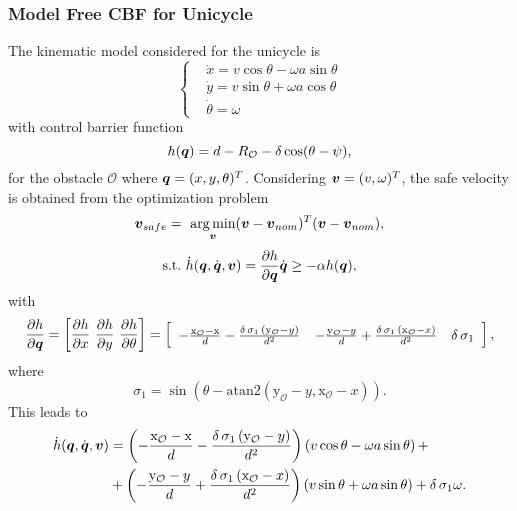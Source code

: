 \subsubsection*{Model Free CBF for Unicycle}
The kinematic model considered for the unicycle is
\begin{equation*}
\left\{ \begin{aligned}
    &\dot{x}      = v\cos\theta -\omega a\sin\theta \\
    &\dot{y}      =  v\sin\theta +\omega a\cos\theta \\
    &\dot{\theta} =  \omega
\end{aligned} \right.
\end{equation*}
with control barrier function
\begin{equation*}
    h({\boldsymbol{q}}) = d-R_{\mathcal{O}}-\delta \cos(\theta - \psi),
\end{equation*}
for the obstacle $\mathcal{O}$ where ${\boldsymbol{q}}=(x,y,\theta)^T$. Considering $\boldsymbol{v} = (v, \omega)^T$, the safe velocity is obtained from the optimization problem 
\begin{equation*}
    \boldsymbol{v}_{safe}=~\underset{\boldsymbol{v}}{\arg\min}(\boldsymbol{v}-\boldsymbol{v}_{nom})^T(\boldsymbol{v}-\boldsymbol{v}_{nom}),
\end{equation*}
\begin{equation*}
    \mathrm{s.t.}\,\, \dot{h}({\boldsymbol{q}},\dot{\boldsymbol{q}},\boldsymbol{v}) = \frac{\partial{h}}{\partial {\boldsymbol{q}}}\dot{\boldsymbol{q}} \geq -\alpha h({\boldsymbol{q}}),
\end{equation*}
with
\begin{equation*}
\frac{\partial{h}}{\partial {\boldsymbol{q}}} = \left[ \frac{\partial{h}}{\partial{x}}\,\, \frac{\partial{h}}{\partial{y}} \,\, \frac{\partial{h}}{\partial{\theta}}  \right]=\left[\begin{array}{ccc}
-\frac{\mathrm{x_\mathcal{O}-x}}{d}-\frac{\delta \,\sigma_1 \,{\left(\mathrm{y_\mathcal{O}}-y\right)}}{d^2} & -\frac{\mathrm{y_\mathcal{O}}-y}{d}+\frac{\delta \,\sigma_1 \,{\left(\mathrm{x_\mathcal{O}}-x\right)}}{d^2} & \delta \,\sigma_1 
\end{array}\right],
\end{equation*}
where
\begin{equation*}
   \sigma_1 =\sin \left(\theta -\textrm{atan2}\left(\mathrm{y_\mathcal{O}}-y,\mathrm{x_\mathcal{O}}-x\right)\right).
\end{equation*}
This leads to
\begin{equation*}
\begin{split}
    \dot{h}({\boldsymbol{q}},\dot{\boldsymbol{q}},\boldsymbol{v}) &= \left(-\frac{\mathrm{x_\mathcal{O}-x}}{d}-\frac{\delta \,\sigma_1 \,{\left(\mathrm{y_\mathcal{O}}-y\right)}}{d^2}\right) (v\cos\theta-\omega a \sin\theta) \,+ \\&+\left(-\frac{\mathrm{y_\mathcal{O}}-y}{d}+\frac{\delta \,\sigma_1 \,{\left(\mathrm{x_\mathcal{O}}-x\right)}}{d^2}\right) (v \sin\theta+\omega a \sin\theta) +\delta \,\sigma_1 \omega.
\end{split}
\end{equation*}
